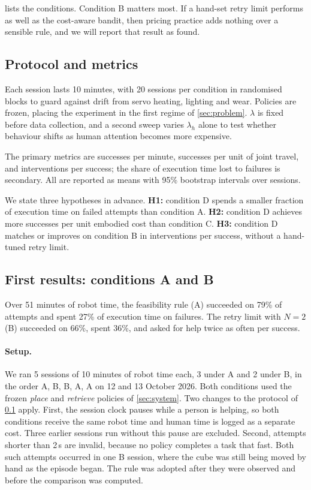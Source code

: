 \documentclass[runningheads]{llncs}
\newcommand{\task}[1]{\textit{#1}}
\begin{document}
 lists the conditions. Condition B matters most. If a hand-set retry limit performs as well as the cost-aware bandit, then pricing practice adds nothing over a sensible rule, and we will report that result as found.

\subsection{Protocol and metrics}
\label{sec:protocol}

Each session lasts 10 minutes, with 20 sessions per condition in randomised blocks to guard against drift from servo heating, lighting and wear. Policies are frozen, placing the experiment in the first regime of \cref{sec:problem}. $\lambda$ is fixed before data collection, and a second sweep varies $\lambda_h$ alone to test whether behaviour shifts as human attention becomes more expensive.

The primary metrics are successes per minute, successes per unit of joint travel, and interventions per success; the share of execution time lost to failures is secondary. All are reported as means with 95\% bootstrap intervals over sessions.

We state three hypotheses in advance. \textbf{H1:} condition D spends a smaller fraction of execution time on failed attempts than condition A. \textbf{H2:} condition D achieves more successes per unit embodied cost than condition C. \textbf{H3:} condition D matches or improves on condition B in interventions per success, without a hand-tuned retry limit.

\subsection{First results: conditions A and B}
\label{sec:results}

Over 51 minutes of robot time, the feasibility rule (A) succeeded on 79\% of attempts and spent 27\% of execution time on failures. The retry limit with $N = 2$ (B) succeeded on 66\%, spent 36\%, and asked for help twice as often per success.

\paragraph{Setup.}
We ran 5 sessions of 10 minutes of robot time each, 3 under A and 2 under B, in the order A, B, B, A, A on 12 and 13 October 2026. Both conditions used the frozen \task{place} and \task{retrieve} policies of \cref{sec:system}. Two changes to the protocol of \cref{sec:protocol} apply. First, the session clock pauses while a person is helping, so both conditions receive the same robot time and human time is logged as a separate cost. Three earlier sessions run without this pause are excluded. Second, attempts shorter than 2\,s are invalid, because no policy completes a task that fast. Both such attempts occurred in one B session, where the cube was still being moved by hand as the episode began. The rule was adopted after they were observed and before the comparison was computed.
\end{document}
